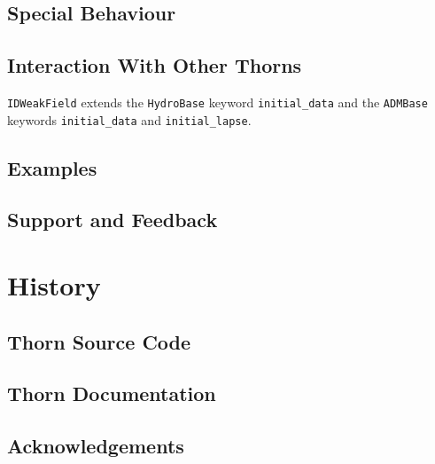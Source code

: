 \subsection{Special Behaviour}

\subsection{Interaction With Other Thorns}

\texttt{IDWeakField} extends the \texttt{HydroBase} keyword \texttt{initial\_data} and the \texttt{ADMBase} keywords \texttt{initial\_data} and \texttt{initial\_lapse}.

\subsection{Examples}

\subsection{Support and Feedback}

\section{History}

\subsection{Thorn Source Code}

\subsection{Thorn Documentation}

\subsection{Acknowledgements}


\begin{thebibliography}{9}

\end{thebibliography}



